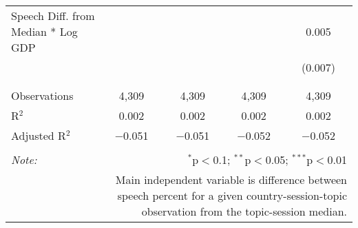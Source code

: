 \begin{table}[!htbp]
\begin{tabular}{@{\extracolsep{5pt}}lcccc}
 Speech Diff. from Median * Log GDP &  &  &  & 0.005 \\ 
  &  &  &  & (0.007) \\ 
  & & & & \\ 
\hline \\[-1.8ex] 
Observations & 4,309 & 4,309 & 4,309 & 4,309 \\ 
R$^{2}$ & 0.002 & 0.002 & 0.002 & 0.002 \\ 
Adjusted R$^{2}$ & $-$0.051 & $-$0.051 & $-$0.052 & $-$0.052 \\ 
\hline 
\hline \\[-1.8ex] 
\textit{Note:}  & \multicolumn{4}{r}{$^{*}$p$<$0.1; $^{**}$p$<$0.05; $^{***}$p$<$0.01} \\ 
 & \multicolumn{4}{r}{Main independent variable is difference between speech percent for a given country-session-topic observation from the topic-session median.} \\ 
\end{tabular} 
\end{table} 
